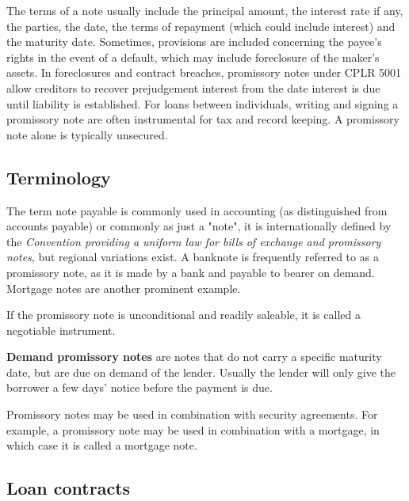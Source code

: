 The terms of a note usually include the principal amount, the interest rate if any, the
parties, the date, the terms of repayment (which could include interest) and the maturity
date. Sometimes, provisions are included concerning the payee's rights in the event of a
default, which may include foreclosure of the maker's assets. In foreclosures and contract
breaches, promissory notes under CPLR 5001 allow creditors to recover prejudgement
interest from the date interest is due until liability is established. For loans between
individuals, writing and signing a promissory note are often instrumental for tax and
record keeping. A promissory note alone is typically unsecured.




\subsection{Terminology}
\label{sss:term-40dc}




The term note payable is commonly used in accounting (as distinguished from accounts
payable) or commonly as just a "note", it is internationally defined by the
\textit{Convention providing a uniform law for bills of exchange and promissory notes},
but regional variations exist. A banknote is frequently referred to as a promissory note,
as it is made by a bank and payable to bearer on demand. Mortgage notes are another
prominent example.



If the promissory note is unconditional and readily saleable, it is called a negotiable instrument.



\textbf{Demand promissory notes} are notes that do not carry a specific maturity date, but are due on demand of the lender. Usually the lender will only give the borrower a few days' notice before the payment is due.



Promissory notes may be used in combination with security agreements. For example, a
promissory note may be used in combination with a mortgage, in which case it is called a
mortgage note.




\subsection{Loan contracts}
\label{sss:loan-d593}




